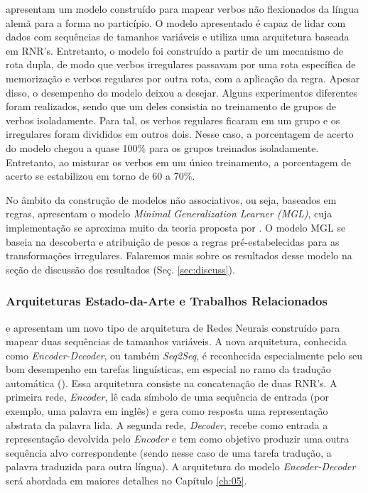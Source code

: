 \cite{wetermann:1997} apresentam um modelo construído para mapear verbos não flexionados da língua alemã para a forma no particípio. O modelo apresentado é capaz de lidar com dados com sequências de tamanhos variáveis e utiliza uma arquitetura baseada em RNR's. Entretanto, o modelo foi construído a partir de um mecanismo de rota dupla, de modo que verbos irregulares passavam por uma rota específica de memorização e verbos regulares por outra rota, com a aplicação da regra. Apesar disso, o desempenho do modelo deixou a desejar. Alguns experimentos diferentes foram realizados, sendo que um deles consistia no treinamento de grupos de verbos isoladamente. Para tal, os verbos regulares ficaram em um grupo e os irregulares foram divididos em outros dois. Nesse caso, a porcentagem de acerto do modelo chegou a quase 100\% para os grupos treinados isoladamente. Entretanto, ao misturar os verbos em um único treinamento, a porcentagem de acerto se estabilizou em torno de 60 a 70\%.  

No âmbito da construção de modelos não associativos, ou seja, baseados em regras, \cite{Albright2003RulesVA} apresentam o modelo \textit{Minimal Generalization Learner (MGL)}, cuja implementação se aproxima muito da teoria proposta por \cite{Pinker:1988}. O modelo MGL se baseia na descoberta e atribuição de pesos a regras pré-estabelecidas para as transformações irregulares. Falaremos mais sobre os resultados desse modelo na seção de discussão dos resultados (Seç. \ref{sec:discuss}).

\subsubsection{Arquiteturas Estado-da-Arte e Trabalhos Relacionados}

\cite{enc-dec:2014} e \cite{seq2seq:2014} apresentam um novo tipo de arquitetura de Redes Neurais construído para mapear duas sequências de tamanhos variáveis. A nova arquitetura, conhecida como \textit{Encoder-Decoder}, ou também \textit{Seq2Seq}, é reconhecida especialmente pelo seu bom desempenho em tarefas linguísticas, em especial no ramo da tradução automática (\cite{Wu:2016}). Essa arquitetura consiste na concatenação de duas RNR's. A primeira rede, \textit{Encoder}, lê cada símbolo de uma sequência de entrada (por exemplo, uma palavra em inglês) e gera como resposta uma representação abstrata da palavra lida. A segunda rede, \textit{Decoder}, recebe como entrada a representação devolvida pelo \textit{Encoder} e tem como objetivo produzir uma outra sequência alvo correspondente (sendo nesse caso de uma tarefa tradução, a palavra traduzida para outra língua). A arquitetura do modelo \textit{Encoder-Decoder} será abordada em maiores detalhes no Capítulo \ref{ch:05}.

